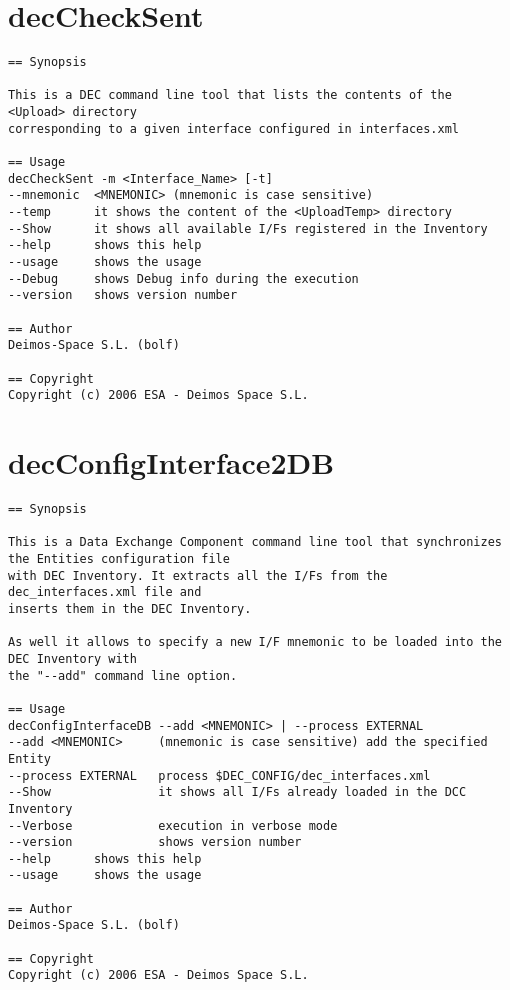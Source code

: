 \documentclass[dec_sum_main.tex]{subfiles}
\begin{document}
\section{decCheckSent} \label{decCheckSent}

\begin{verbatim}
== Synopsis

This is a DEC command line tool that lists the contents of the <Upload> directory
corresponding to a given interface configured in interfaces.xml

== Usage
decCheckSent -m <Interface_Name> [-t]
--mnemonic  <MNEMONIC> (mnemonic is case sensitive)
--temp      it shows the content of the <UploadTemp> directory
--Show      it shows all available I/Fs registered in the Inventory
--help      shows this help
--usage     shows the usage
--Debug     shows Debug info during the execution
--version   shows version number

== Author
Deimos-Space S.L. (bolf)

== Copyright
Copyright (c) 2006 ESA - Deimos Space S.L.
\end{verbatim}

\section{decConfigInterface2DB}

\begin{verbatim}
== Synopsis

This is a Data Exchange Component command line tool that synchronizes the Entities configuration file
with DEC Inventory. It extracts all the I/Fs from the dec_interfaces.xml file and 
inserts them in the DEC Inventory.

As well it allows to specify a new I/F mnemonic to be loaded into the DEC Inventory with 
the "--add" command line option.

== Usage
decConfigInterfaceDB --add <MNEMONIC> | --process EXTERNAL
--add <MNEMONIC>     (mnemonic is case sensitive) add the specified Entity  
--process EXTERNAL   process $DEC_CONFIG/dec_interfaces.xml
--Show               it shows all I/Fs already loaded in the DCC Inventory
--Verbose            execution in verbose mode
--version            shows version number
--help      shows this help
--usage     shows the usage

== Author
Deimos-Space S.L. (bolf)

== Copyright
Copyright (c) 2006 ESA - Deimos Space S.L.

\end{verbatim}
\end{document}
